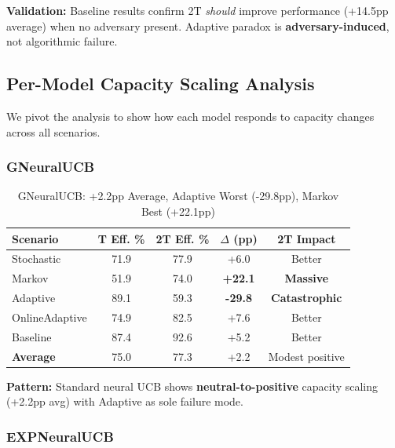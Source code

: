 \documentclass[11pt,a4paper]{article}
\newcommand{\critical}[1]{\textcolor{criticalcolor}{\textbf{#1}}}
\newcommand{\success}[1]{\textcolor{successcolor}{\textbf{#1}}}
\begin{document}
\vspace{-0.2cm}

\textbf{Validation:} Baseline results confirm 2T \textit{should} improve performance (+14.5pp average) when no adversary present. Adaptive paradox is \critical{adversary-induced}, not algorithmic failure.

\subsection{Per-Model Capacity Scaling Analysis}

We pivot the analysis to show how each model responds to capacity changes across all scenarios.

\subsubsection{GNeuralUCB}

\vspace{-0.4cm}

\begin{table}[H]
\scriptsize
\centering
\begin{tabular}{lcccc}
\toprule
\textbf{Scenario} & \textbf{T Eff. \%} & \textbf{2T Eff. \%} & \textbf{$\Delta$ (pp)} & \textbf{2T Impact} \\
\midrule
Stochastic & 71.9 & 77.9 & +6.0 & Better \\
Markov & 51.9 & 74.0 & \success{+22.1} & \success{Massive} \\
Adaptive & 89.1 & 59.3 & \critical{-29.8} & \critical{Catastrophic} \\
OnlineAdaptive & 74.9 & 82.5 & +7.6 & Better \\
Baseline & 87.4 & 92.6 & +5.2 & Better \\
\midrule
\textbf{Average} & 75.0 & 77.3 & +2.2 & Modest positive \\
\bottomrule
\end{tabular}
\vspace{-0.2cm}
\caption{GNeuralUCB: +2.2pp Average, Adaptive Worst (-29.8pp), Markov Best (+22.1pp)}
\end{table}

\vspace{-0.2cm}

\textbf{Pattern:} Standard neural UCB shows \textbf{neutral-to-positive} capacity scaling (+2.2pp avg) with Adaptive as sole failure mode.

\subsubsection{EXPNeuralUCB}
\end{document}
